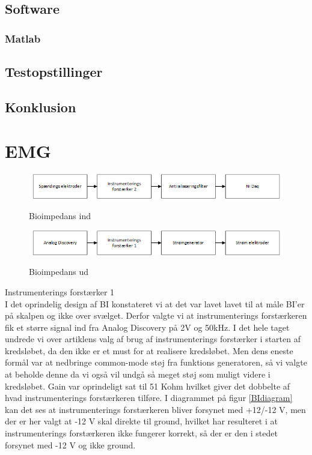 \section{Software}
\subsection{Matlab}

\section{Testopstillinger}
\section{Konklusion}

\chapter{EMG}


\begin{figure}[H]
\centering
{\includegraphics[width=\linewidth]
{Figure/analyse2}}
\caption{Bioimpedans ind}
\label{analyse2}
\end{figure}



\begin{figure}[H]
\centering
{\includegraphics[width=\linewidth]
{Figure/analyse1}}
\caption{Bioimpedans ud}
\label{fig:analyse1}
\end{figure}

Instrumenterings forstærker 1\\
I det oprindelig design af BI konstateret vi at det var lavet lavet til at måle BI'er på skalpen og ikke over svælget. Derfor valgte vi at instrumenterings forstærkeren fik et større signal ind fra Analog Discovery på 2V og 50kHz. I det hele taget undrede vi over artiklens valg af brug af instrumenterings forstærker i starten af kredsløbet, da den ikke er et must for at realisere kredsløbet. Men dens eneste formål var at nedbringe common-mode støj fra funktions generatoren, så vi valgte at beholde denne da vi også vil undgå så meget støj som muligt videre i kredsløbet. Gain var oprindeligt sat til 51 Kohm hvilket giver det dobbelte af hvad instrumenterings forstærkeren tilføre. I diagrammet på figur \ref{BIdiagram} kan det ses at instrumenterings forstærkeren bliver forsynet med +12/-12 V, men der er her valgt at -12 V skal direkte til ground, hvilket har resulteret i at instrumenterings forstærkeren ikke fungerer korrekt, så der er den i stedet forsynet med -12 V og ikke ground.  





